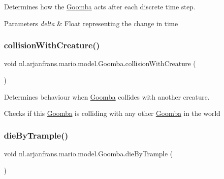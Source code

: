 Determines how the \hyperlink{classnl_1_1arjanfrans_1_1mario_1_1model_1_1Goomba}{Goomba} acts after each discrete time step. 


\begin{DoxyParams}{Parameters}
{\em delta} & Float representing the change in time \\
\hline
\end{DoxyParams}
\mbox{\label{classnl_1_1arjanfrans_1_1mario_1_1model_1_1Goomba_a4582ee22090958c89e08267a2393c46c}} 
\subsubsection{\texorpdfstring{collision\+With\+Creature()}{collisionWithCreature()}}
{\footnotesize\ttfamily void nl.\+arjanfrans.\+mario.\+model.\+Goomba.\+collision\+With\+Creature (\begin{DoxyParamCaption}{ }\end{DoxyParamCaption})\hspace{0.3cm}{\ttfamily [protected]}}



Determines behaviour when \hyperlink{classnl_1_1arjanfrans_1_1mario_1_1model_1_1Goomba}{Goomba} collides with another creature. 

Checks if this \hyperlink{classnl_1_1arjanfrans_1_1mario_1_1model_1_1Goomba}{Goomba} is colliding with any other \hyperlink{classnl_1_1arjanfrans_1_1mario_1_1model_1_1Goomba}{Goomba} in the world \mbox{\label{classnl_1_1arjanfrans_1_1mario_1_1model_1_1Goomba_a307cf941d782f3a0c2734eb56c1165da}} 
\subsubsection{\texorpdfstring{die\+By\+Trample()}{dieByTrample()}}
{\footnotesize\ttfamily void nl.\+arjanfrans.\+mario.\+model.\+Goomba.\+die\+By\+Trample (\begin{DoxyParamCaption}{ }\end{DoxyParamCaption})\hspace{0.3cm}{\ttfamily [private]}}



